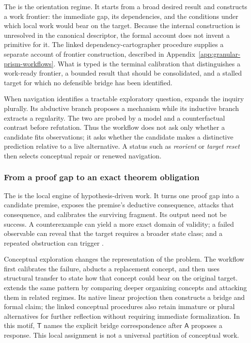 The  is the orientation regime. It starts from a
broad desired result and constructs a work frontier: the immediate gap, its
dependencies, and the conditions under which local work would bear on the
target. Because the internal construction is unresolved in the canonical
descriptor, the formal account does not invent a primitive for it. The linked
dependency-cartographer procedure supplies a separate account of frontier
construction, described in Appendix~\ref{app:granular-prism-workflows}. What is
typed is the terminal calibration that distinguishes a work-ready frontier, a
bounded result that should be consolidated, and a stalled target for which no
defensible bridge has been identified.

When navigation identifies a tractable exploratory question,
 expands the inquiry plurally. Its abductive
branch proposes a mechanism while its inductive branch extracts a regularity.
The two are probed by a model and a counterfactual contrast before refutation.
Thus the workflow does not ask only whether a candidate fits observations; it
asks whether the candidate makes a distinctive prediction relative to a live
alternative. A status such as \emph{reorient} or \emph{target reset} then
selects conceptual repair or renewed navigation.

\subsubsection{From a proof gap to an exact theorem obligation}

The  is the local engine of hypothesis-driven work. It
turns one proof gap into a candidate premise, exposes the premise's deductive
consequence, attacks that consequence, and calibrates the surviving fragment.
Its output need not be success. A counterexample can yield a more exact domain
of validity; a failed observable can reveal that the target requires a broader
state class; and a repeated obstruction can trigger
.

Conceptual exploration changes the representation of the problem. The
workflow first calibrates the failure, abducts a replacement concept, and then
uses structural transfer to state how that concept could bear on the original
target.\  extends the same pattern by
comparing deeper organizing concepts and attacking them in related regimes.
Its native linear projection then constructs a bridge and formal claim; the
linked conceptual procedures also retain immature or plural alternatives for
further reflection without requiring immediate formalization. In this motif,
$\mathsf{T}$ names the explicit bridge correspondence after $\mathsf{A}$ proposes
a response. This local assignment is not a universal partition of conceptual work.

